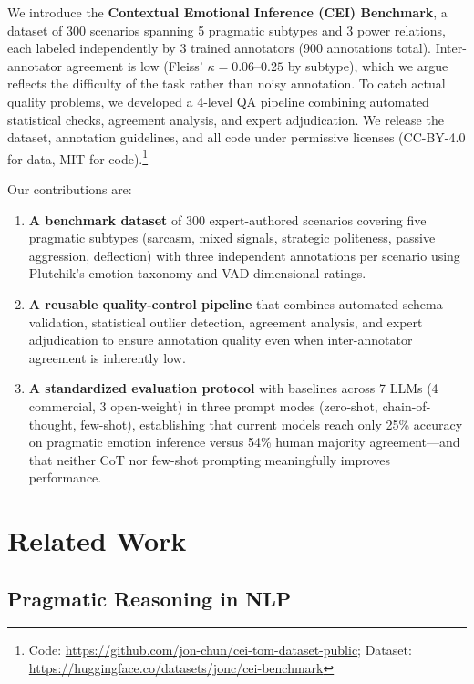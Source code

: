 \documentclass[twoside,11pt]{article}
\begin{document}
We introduce the \textbf{Contextual Emotional Inference (CEI) Benchmark}, a dataset of 300 scenarios spanning 5 pragmatic subtypes and 3 power relations, each labeled independently by 3 trained annotators (900 annotations total). Inter-annotator agreement is low (Fleiss' $\kappa = 0.06$--$0.25$ by subtype), which we argue reflects the difficulty of the task rather than noisy annotation. To catch actual quality problems, we developed a 4-level QA pipeline combining automated statistical checks, agreement analysis, and expert adjudication. We release the dataset, annotation guidelines, and all code under permissive licenses (CC-BY-4.0 for data, MIT for code).\footnote{Code: \url{https://github.com/jon-chun/cei-tom-dataset-public}; Dataset: \url{https://huggingface.co/datasets/jonc/cei-benchmark}}

Our contributions are:
\begin{enumerate}[leftmargin=*,noitemsep]
    \item \textbf{A benchmark dataset} of 300 expert-authored scenarios covering five pragmatic subtypes (sarcasm, mixed signals, strategic politeness, passive aggression, deflection) with three independent annotations per scenario using Plutchik's emotion taxonomy and VAD dimensional ratings.
    \item \textbf{A reusable quality-control pipeline} that combines automated schema validation, statistical outlier detection, agreement analysis, and expert adjudication to ensure annotation quality even when inter-annotator agreement is inherently low.
    \item \textbf{A standardized evaluation protocol} with baselines across 7 LLMs (4 commercial, 3 open-weight) in three prompt modes (zero-shot, chain-of-thought, few-shot), establishing that current models reach only 25\% accuracy on pragmatic emotion inference versus 54\% human majority agreement---and that neither CoT nor few-shot prompting meaningfully improves performance.
\end{enumerate}

\section{Related Work}
\label{sec:related}

\subsection{Pragmatic Reasoning in NLP}
\end{document}

